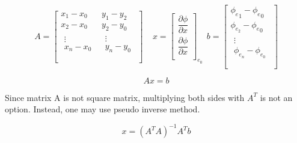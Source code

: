 \documentclass[a4paper, 12pt]{article}
\begin{document}
\begin{equation}
    A = \begin{bmatrix}
x_{1} - x_{0} & y_{1} - y_{2} \\
x_{2} - x_{0} & y_{2} - y_{0} \\
\begin{matrix}
 \vdots \\
x_{n} - x_{0} \\
\end{matrix} & \begin{matrix}
 \vdots \\
y_{n} - y_{0} \\
\end{matrix} \\
\end{bmatrix}\ \ \ \ \ x = \begin{bmatrix}
\dfrac{\partial\phi}{\partial x} \\[6pt]
\dfrac{\partial\phi}{\partial x} \\
\end{bmatrix}_{e_{0}}\ \ b = \begin{bmatrix}
{\phi_{e}}_{1} - {\phi_{e}}_{0} \\
\phi_{e_{2}} - {\phi_{e}}_{0} \\
\begin{matrix}
 \vdots \\
\phi_{e_{n}} - \phi_{e_{0}} \\
\end{matrix} \\
\end{bmatrix}
\end{equation}

\begin{equation}
    Ax = b
\end{equation}

Since matrix A is not square matrix, multiplying both sides with
\(A^{T}\) is not an option. Instead, one may use pseudo inverse method.

\begin{equation}
    x = \left( A^{T}A \right)^{- 1}A^{T}b
\end{equation}
\end{document}
